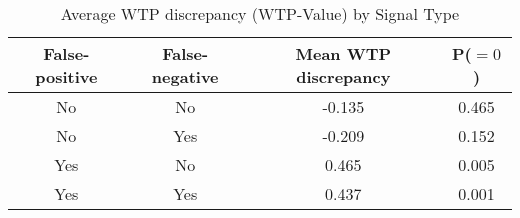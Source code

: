 \begin{table}[H]\centering \caption{Average WTP discrepancy (WTP-Value) by Signal Type} \begin{tabular}{cccc} \hline \hline
\textbf{False-positive}&\textbf{False-negative}&\textbf{Mean WTP discrepancy}& \textbf{P($=0$)}\\ \hline
No&No&-0.135&0.465\\
No&Yes&-0.209&0.152\\
Yes&No&0.465&0.005\\
Yes&Yes&0.437&0.001\\
\hline \end{tabular} \end{table}
